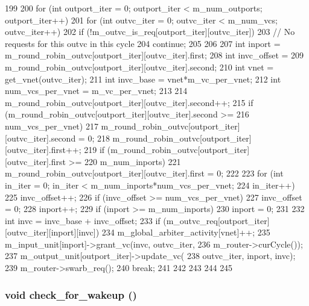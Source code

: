 \begin{DoxyCode}
199 {
200     for (int outport_iter = 0; outport_iter < m_num_outports; outport_iter++) {
201         for (int outvc_iter = 0; outvc_iter < m_num_vcs; outvc_iter++) {
202             if (!m_outvc_is_req[outport_iter][outvc_iter]) {
203                 // No requests for this outvc in this cycle
204                 continue;
205             }
206 
207             int inport = m_round_robin_outvc[outport_iter][outvc_iter].first;
208             int invc_offset =
209                 m_round_robin_outvc[outport_iter][outvc_iter].second;
210             int vnet = get_vnet(outvc_iter);
211             int invc_base = vnet*m_vc_per_vnet;
212             int num_vcs_per_vnet = m_vc_per_vnet;
213 
214             m_round_robin_outvc[outport_iter][outvc_iter].second++;
215             if (m_round_robin_outvc[outport_iter][outvc_iter].second >=
216                num_vcs_per_vnet) {
217                 m_round_robin_outvc[outport_iter][outvc_iter].second = 0;
218                 m_round_robin_outvc[outport_iter][outvc_iter].first++;
219                 if (m_round_robin_outvc[outport_iter][outvc_iter].first >=
220                    m_num_inports)
221                     m_round_robin_outvc[outport_iter][outvc_iter].first = 0;
222             }
223             for (int in_iter = 0; in_iter < m_num_inports*num_vcs_per_vnet;
224                     in_iter++) {
225                 invc_offset++;
226                 if (invc_offset >= num_vcs_per_vnet) {
227                     invc_offset = 0;
228                     inport++;
229                     if (inport >= m_num_inports)
230                         inport = 0;
231                 }
232                 int invc = invc_base + invc_offset;
233                 if (m_outvc_req[outport_iter][outvc_iter][inport][invc]) {
234                     m_global_arbiter_activity[vnet]++;
235                     m_input_unit[inport]->grant_vc(invc, outvc_iter,
236                         m_router->curCycle());
237                     m_output_unit[outport_iter]->update_vc(
238                         outvc_iter, inport, invc);
239                     m_router->swarb_req();
240                     break;
241                 }
242             }
243         }
244     }
245 }
\end{DoxyCode}
\hypertarget{classVCallocator__d_a3312235aad1a35d2eb8dfe6b3a93d880}{
\subsubsection[{check\_\-for\_\-wakeup}]{\setlength{\rightskip}{0pt plus 5cm}void check\_\-for\_\-wakeup ()}}
\label{classVCallocator__d_a3312235aad1a35d2eb8dfe6b3a93d880}



